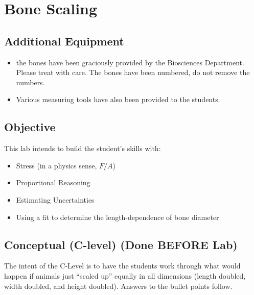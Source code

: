 \documentclass[fleqn,letterpaper]{article}
\begin{document}
\cfoot{}
\headsep=25pt

\section*{Bone Scaling}

\subsection*{Additional Equipment}

\begin{itemize}
  \item{the bones have been graciously provided by the Biosciences Department.  Please treat with care.  The bones have been numbered, do not remove the numbers.}
  \item{Various measuring tools have also been provided to the students.}
\end{itemize}

\subsection*{Objective}

This lab intends to build the student's skills with:
%
\begin{itemize}
 \item{Stress (in a physics sense, $F/A$)}
 \item{Proportional Reasoning}
 \item{Estimating Uncertainties}
 \item{Using a fit to determine the length-dependence of bone diameter}
\end{itemize}
%

\subsection*{Conceptual (C-level) (Done BEFORE Lab)}

The intent of the C-Level is to have the students work through what would happen if animals just ``scaled up'' equally in all dimensions (length doubled, width doubled, and height doubled).  Answers to the bullet points follow.
\end{document}
